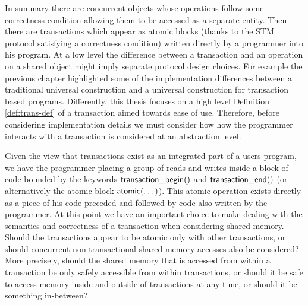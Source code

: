 In summary there are concurrent objects whose operations follow some correctness condition
allowing them to be accessed as a separate entity.
Then there are transactions which appear as atomic blocks (thanks to the STM protocol
satisfying a correctness condition) written directly by a programmer into his program.
At a low level the difference between a transaction and an operation
on a shared object might imply separate protocol design choices.
For example the previous chapter highlighted some of the implementation
differences between a traditional universal construction and a
universal construction for transaction based programs.
Differently, this thesis focuses on a high level Definition \ref{def:trans-def}
of a transaction aimed towards ease of use.
Therefore, before considering implementation details we must consider how
how the programmer interacts with a transaction is considered at an abstraction level.


Given the view that transactions exist as an integrated part of
a users program, we have
the programmer placing a group of reads and writes
inside a block of code bounded by the keywords $\act{transaction\_begin}()$ and
$\act{transaction\_end}()$ (or alternatively the atomic block $\act{atomic}(\dots)$).
This atomic operation exists directly as a piece of his code preceded
and followed by code also written by the programmer.
At this point we have an important choice to make dealing with the
semantics and correctness of a transaction when considering shared memory.
Should the transactions appear to be atomic only with other transactions, or should
concurrent non-transactional shared memory accesses also be considered?
More precisely, should the shared memory that is accessed from within a transaction
be only safely accessible from within transactions, or should it be
safe to access memory inside and outside of transactions at any time,
or should it be something in-between?

